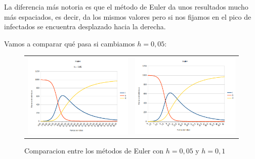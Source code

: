 \documentclass[11pt,a4paper]{report}
\begin{document}
La diferencia más notoria es que el método de Euler da unos resultados mucho más espaciados, es decir, da los mismos valores pero si nos fijamos en el pico de infectados se encuentra desplazado hacia la derecha.

Vamos a comparar qué pasa si cambiamos $h = 0,05$:

\begin{figure}[H]
\begin{tabular}{ll}
\includegraphics[scale=0.25]{img/inmunidad/euler-0-5.png}
&
\includegraphics[scale=0.25]{img/inmunidad/euler.png}
\end{tabular}
\caption{Comparacion entre los métodos de Euler con $h = 0,05$ y $h = 0,1$}
\end{figure}
\end{document}
